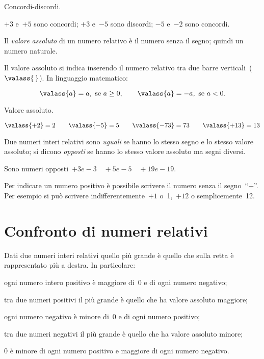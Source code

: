 \begin{exrig}
 \begin{esempio}
 Concordi-discordi.
 
$+3$ e~$+5$ sono concordi; \quad 
$+3$ e~$-5$ sono discordi; \quad 
$-5$ e~$-2$ sono concordi.
\end{esempio}
\end{exrig}

\begin{definizione}
Il \emph{valore assoluto} di un numero relativo è il numero senza il segno; 
quindi un numero naturale.
\end{definizione}

Il valore assoluto si indica inserendo il numero relativo tra due barre 
verticali~($\valass{\,}$). In linguaggio
matematico:

\[ \valass{a}=a,\text{ se }a\ge0,\qquad \valass{a}=-a,\text{ se }a<0.\]

\begin{exrig}
 \begin{esempio}
 Valore assoluto.
 
$\valass{+2}=2 \qquad \valass{-5}=5 \qquad 
 \valass{-73}=73 \qquad \valass{+13}=13$
 \end{esempio}
\end{exrig}

\begin{definizione}
 Due numeri interi relativi sono \emph{uguali} se hanno lo stesso segno e lo 
stesso valore assoluto;
 si dicono \emph{opposti} se hanno lo stesso valore assoluto ma segni diversi.
\end{definizione}

Sono numeri opposti~$+3 e -3 \quad +5 e -5 \quad +19 e -19$.

\osservazione Per indicare un numero positivo è possibile scrivere il numero 
senza il segno~``$+$''.
Per esempio si può scrivere indifferentemente~$+1$ o~1,~$+12$ o 
semplicemente~12.

\section{Confronto di numeri relativi}
\label{sec:02_confronto}

Dati due numeri interi relativi quello più grande è quello che sulla retta è 
rappresentato più a destra.
In particolare:
 \begin{enumeratea}
 \item ogni numero intero positivo è maggiore di~0 e di ogni numero negativo;
 \item tra due numeri positivi il più grande è quello che ha valore assoluto 
maggiore;
 \item ogni numero negativo è minore di~0 e di ogni numero positivo;
 \item tra due numeri negativi il più grande è quello che ha valore assoluto 
minore;
 \item 0 è minore di ogni numero positivo e maggiore di ogni numero negativo.
 \end{enumeratea}

